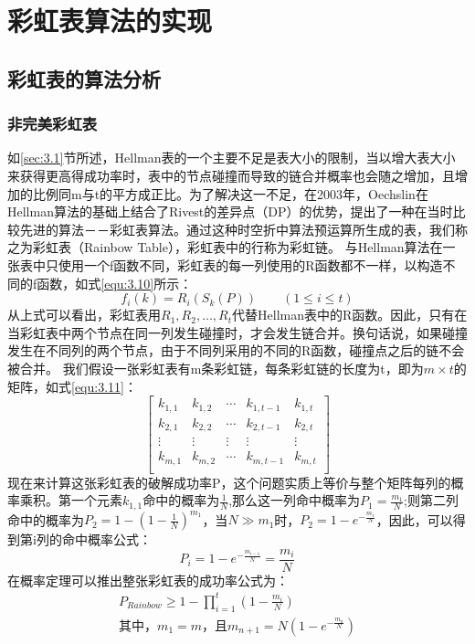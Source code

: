 \chapter{彩虹表算法的实现}
\section{彩虹表的算法分析}
\label{sec:3.3}
	\subsection{非完美彩虹表}
如\ref{sec:3.1}节所述，Hellman表的一个主要不足是表大小的限制，当以增大表大小来获得更高得成功率时，表中的节点碰撞而导致的链合并概率也会随之增加，且增加的比例同m与t的平方成正比。为了解决这一不足，在2003年，Oechslin在Hellman算法的基础上结合了Rivest的差异点（DP）的优势，提出了一种在当时比较先进的算法－－彩虹表算法\cite{PO}。通过这种时空折中算法预运算所生成的表，我们称之为彩虹表（Rainbow Table），彩虹表中的行称为彩虹链。
与Hellman算法在一张表中只使用一个f函数不同，彩虹表的每一列使用的R函数都不一样，以构造不同的f函数，如式\eqref{equ:3.10}所示：
\begin{equation}
\label{equ:3.10}
f_i(k)=R_i(S_k(P)) \quad \quad  (1\leq i \leq t) 
\end{equation}
从上式可以看出，彩虹表用$R_1,R_2,\ldots ,R_t$代替Hellman表中的R函数。因此，只有在当彩虹表中两个节点在同一列发生碰撞时，才会发生链合并。换句话说，如果碰撞发生在不同列的两个节点，由于不同列采用的不同的R函数，碰撞点之后的链不会被合并。
我们假设一张彩虹表有m条彩虹链，每条彩虹链的长度为t，即为$m\times t$的矩阵，如式\eqref{equ:3.11}：
\begin{equation}
\label{equ:3.11}
\begin{bmatrix}
k_{1,1} & k_{1,2} & \cdots & k_{1,t-1} & k_{1,t} \\
k_{2,1} & k_{2,2} & \cdots & k_{2,t-1} & k_{2,t} \\
\vdots & \vdots & \vdots & \vdots & \vdots \\
k_{m,1} & k_{m,2} & \cdots & k_{m,t-1} & k_{m,t} \\
\end{bmatrix}
\end{equation}
现在来计算这张彩虹表的破解成功率P，这个问题实质上等价与整个矩阵每列的概率乘积。第一个元素$k_{1,1}$命中的概率为$\frac{1}{N}$,那么这一列命中概率为$P_1=\frac{m_{1}}{N}$;则第二列命中的概率为$P_2=1-(1-\frac{1}{N})^{m_1}$，当$N\gg m_{1}$时，$P_2=1-e^{-\tfrac{m_1}N{}}$，因此，可以得到第i列的命中概率公式：
\begin{equation}
P_i=1-e^{-\tfrac{m_{i-1}}{N}}=\frac{m_i}{N}
\end{equation}
在概率定理可以推出整张彩虹表的成功率公式为：
\begin{eqnarray}
\label{equ:3.12}
P_{Rainbow} \ge 1-\prod^{t}_{i=1}\left(1-\frac{m_{i}}{N}\right) \nonumber\\
\text{其中，} m_{1}=m \text{，且} m_{n+1} = N\left(1-e^{-\tfrac{m_{n}}{N}}\right)
\end{eqnarray}

